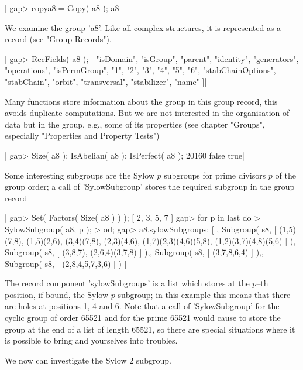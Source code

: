 |    gap> copya8:= Copy( a8 );
    a8|

We examine  the group 'a8'.  Like  all  complex {\GAP} structures,  it is
represented as a record (see "Group Records").

|    gap> RecFields( a8 );
    [ "isDomain", "isGroup", "parent", "identity", "generators",
      "operations", "isPermGroup", "1", "2", "3", "4", "5", "6",
      "stabChainOptions", "stabChain", "orbit", "transversal",
      "stabilizer", "name" ]|

Many functions store information  about the  group  in this group record,
this avoids  duplicate computations.   But  we are  not interested in the
organisation of data but  in the group, e.g., some of its properties (see
chapter "Groups", especially "Properties and Property Tests")\:

|    gap> Size( a8 ); IsAbelian( a8 ); IsPerfect( a8 );
    20160
    false
    true|

Some interesting subgroups are the Sylow $p$ subgroups for prime divisors
$p$ of the  group order; a call  of  'SylowSubgroup' stores the  required
subgroup in the group record\:

|    gap> Set( Factors( Size( a8 ) ) );
    [ 2, 3, 5, 7 ]
    gap> for p in last do
    >      SylowSubgroup( a8, p );
    >    od;
    gap> a8.sylowSubgroups;
    [ , Subgroup( s8, [ (1,5)(7,8), (1,5)(2,6), (3,4)(7,8), (2,3)(4,6),
          (1,7)(2,3)(4,6)(5,8), (1,2)(3,7)(4,8)(5,6) ] ),
      Subgroup( s8, [ (3,8,7), (2,6,4)(3,7,8) ] ),,
      Subgroup( s8, [ (3,7,8,6,4) ] ),,
      Subgroup( s8, [ (2,8,4,5,7,3,6) ] ) ]|

The record component  'sylowSubgroups'  is a  list  which  stores at  the
$p$--th position, if bound, the Sylow $p$ subgroup; in  this example this
means that there are holes at  positions 1, 4 and 6.  Note that a call of
'SylowSubgroup'  for the cyclic group of  order 65521  and for  the prime
65521 would cause  {\GAP} to store the group  at  the end  of  a  list of
length  65521, so  there are special situations where  it is possible  to
bring {\GAP} and yourselves into troubles.

We now can investigate the Sylow 2 subgroup.

